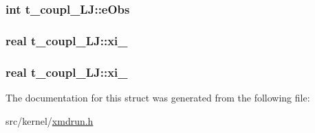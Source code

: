 \hypertarget{structt__coupl__LJ_a1c3bd233f03147649a0956df0c5e3523}{
\subsubsection[{e\-Obs}]{\setlength{\rightskip}{0pt plus 5cm}int {\bf t\-\_\-coupl\-\_\-\-L\-J\-::e\-Obs}}}\label{structt__coupl__LJ_a1c3bd233f03147649a0956df0c5e3523}
\hypertarget{structt__coupl__LJ_a75de8f863bdbd19ba65fd7fd3afa2351}{
\subsubsection[{xi\-\_\-12}]{\setlength{\rightskip}{0pt plus 5cm}real {\bf t\-\_\-coupl\-\_\-\-L\-J\-::xi\-\_}}}\label{structt__coupl__LJ_a75de8f863bdbd19ba65fd7fd3afa2351}
\hypertarget{structt__coupl__LJ_a013a13e550e30300129d11c721c5a7e2}{
\subsubsection[{xi\-\_\-6}]{\setlength{\rightskip}{0pt plus 5cm}real {\bf t\-\_\-coupl\-\_\-\-L\-J\-::xi\-\_}}}\label{structt__coupl__LJ_a013a13e550e30300129d11c721c5a7e2}


\-The documentation for this struct was generated from the following file\-:\begin{DoxyCompactItemize}
\item 
src/kernel/\hyperlink{xmdrun_8h}{xmdrun.\-h}\end{DoxyCompactItemize}
